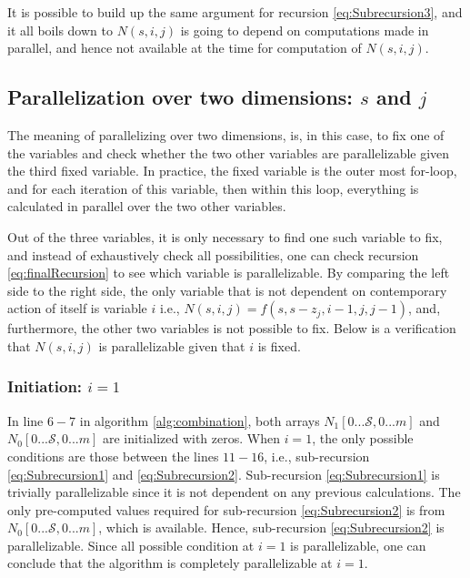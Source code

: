 \documentclass[a4paper,11pt]{article}
\begin{document}
It is possible to build up the same argument for recursion \ref{eq:Subrecursion3}, and it all boils down to $N(s,i,j)$ is going to depend on computations made in parallel, and hence not available at the time for computation of $N(s,i,j)$.

\subsection{Parallelization over two dimensions: $s$ and $j$}
\label{sec:2Dpara}
The meaning of parallelizing over two dimensions, is, in this case, to fix one of the variables and check whether the two other variables are parallelizable given the third fixed variable. In practice, the fixed variable is the outer most for-loop, and for each iteration of this variable, then within this loop, everything is calculated in parallel over the two other variables.

Out of the three variables, it is only necessary to find one such variable to fix, and instead of exhaustively check all possibilities, one can check recursion \ref{eq:finalRecursion} to see which variable is parallelizable. By comparing the left side to the right side, the only variable that is not dependent on contemporary action of itself is variable $i$ i.e., $N(s,i,j)=f(s,s-z_{j},i-1,j,j-1)$, and, furthermore, the other two variables is not possible to fix. Below is a verification that $N(s,i,j)$ is parallelizable given that $i$ is fixed.

\begin{comment}
\subsubsection{Initiation: $i=0$}
\label{subsubsec:v1}
Recursion \ref{eq:Subrecursion1} (i.e., when $i=0$) is trivially parallelizable since it is not dependent on any previous calculations.
\end{comment}

\subsubsection{Initiation: $i=1$}
\label{subsubsec:v2}
In line $6-7$ in algorithm \ref{alg:combination}, both arrays $N_{1}[0...\mathcal{S},0...m]$ and $N_{0}[0...\mathcal{S},0...m]$ are initialized with zeros. When $i=1$, the only possible conditions are those between the lines $11-16$, i.e., sub-recursion \ref{eq:Subrecursion1} and \ref{eq:Subrecursion2}. Sub-recursion \ref{eq:Subrecursion1} is trivially parallelizable since it is not dependent on any previous calculations. The only pre-computed values required for sub-recursion \ref{eq:Subrecursion2} is from $N_{0}[0...\mathcal{S},0...m]$, which is available. Hence, sub-recursion \ref{eq:Subrecursion2} is parallelizable. Since all possible condition at $i=1$ is parallelizable, one can conclude that the algorithm is completely parallelizable at $i=1$.
\end{document}
